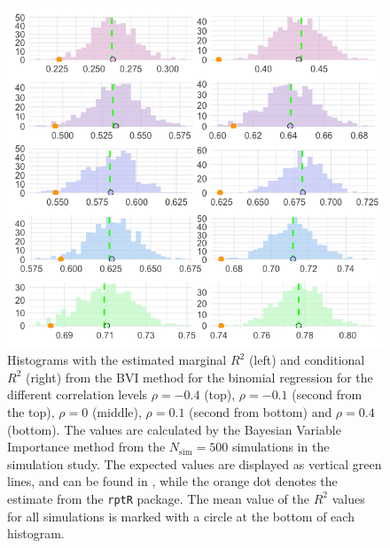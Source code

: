\begin{figure}[H]
  \centering
  \includegraphics[width=1.1\linewidth]{Figures/Simulation study/R2_combined_logit_test.png}
  \caption{Histograms with the estimated marginal $R^2$ (left) and conditional $R^2$ (right) from the BVI method for the binomial regression for the different correlation levels $\rho=-0.4$ (top), $\rho=-0.1$ (second from the top), $\rho=0$ (middle), $\rho=0.1$ (second from bottom) and $\rho=0.4$ (bottom). The values are calculated by the Bayesian Variable Importance method from the $N_{\text{sim}}=500$ simulations in the simulation study. The expected values are displayed as vertical green lines, and can be found in , while the orange dot denotes the estimate from the \texttt{rptR} package. The mean value of the $R^2$ values for all simulations is marked with a circle at the bottom of each histogram.}
  \label{fig:r2_combined_logit}
\end{figure}




